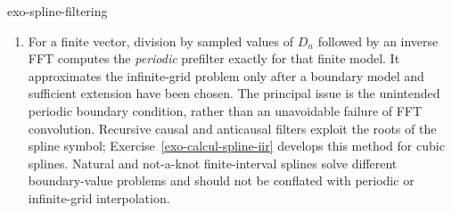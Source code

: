 \begin{correction}{exo-spline-filtering}
\begin{enumerate}
For $r\geq2$ and $m\ne0$, the squared terms are bounded by
$(2|m|-1)^{-4}$. This bound is summable in $m$ and integrable over
$\eta\in[-\pi,\pi]$, while $|H_r(\eta)|\leq1$ on the central interval.
Dominated convergence on these intervals therefore proves
$H_r\to\mathbf1_{[-\pi,\pi]}$ in $L^2(\RR)$.
Since $\widehat{\sinc}=\mathbf1_{[-\pi,\pi]}$ in our convention,
Plancherel gives $\beta^n_{\mathrm{card}}\to\sinc$ in $L^2$.
The argument keeps the alternating signs for even spline degrees; dropping
them would give a different cardinal kernel.

For the cubic spline, $D_3(\xi)=(2+\cos\xi)/3$ and its inverse filter is
$b[k]=\sqrt3(\sqrt3-2)^{|k|}$. Hence
\[
 \beta^3_{\mathrm{card}}(x)=\sqrt3\sum_{k\in\ZZ}
              (\sqrt3-2)^{|k|}\beta^3(x-k).
\]
It has unbounded, exponentially decaying tails, whereas sinc decays only
algebraically. The limiting cardinal interpolation uses sinc translates,
as in Shannon's sampling theorem.
\item For a finite vector, division by sampled values of $D_n$ followed by
an inverse FFT computes the \emph{periodic} prefilter exactly for that finite
model. It approximates the infinite-grid problem only after a boundary model
and sufficient extension have been chosen. The principal issue is the
unintended periodic boundary condition, rather than an unavoidable failure
of FFT convolution. Recursive causal and anticausal filters exploit the
roots of the spline symbol; Exercise~\ref{exo-calcul-spline-iir} develops
this method for cubic splines. Natural and not-a-knot finite-interval splines
solve different boundary-value problems and should not be conflated with
periodic or infinite-grid interpolation.
\end{enumerate}
\end{correction}
